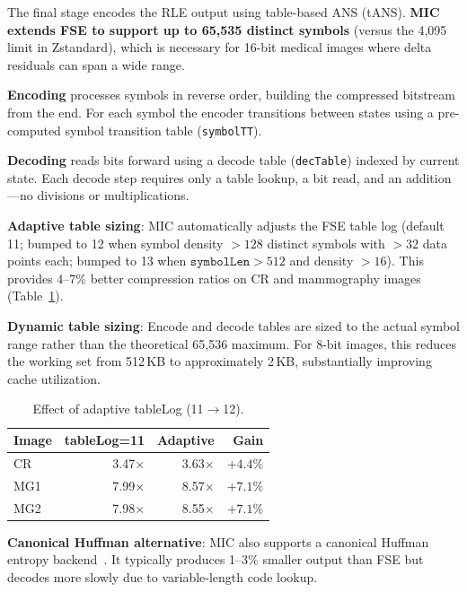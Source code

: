 \documentclass[10pt,twocolumn]{article}
\begin{document}
The final stage encodes the RLE output using table-based ANS (tANS). \textbf{MIC extends FSE to support up to 65,535 distinct symbols} (versus the 4,095 limit in Zstandard), which is necessary for 16-bit medical images where delta residuals can span a wide range.

\textbf{Encoding} processes symbols in reverse order, building the compressed bitstream from the end. For each symbol the encoder transitions between states using a pre-computed symbol transition table (\texttt{symbolTT}).

\textbf{Decoding} reads bits forward using a decode table (\texttt{decTable}) indexed by current state. Each decode step requires only a table lookup, a bit read, and an addition---no divisions or multiplications.

\textbf{Adaptive table sizing}: MIC automatically adjusts the FSE table log (default 11; bumped to 12 when symbol density $>128$ distinct symbols with $>32$ data points each; bumped to 13 when $\mathtt{symbolLen} > 512$ and density $>16$). This provides 4--7\% better compression ratios on CR and mammography images (Table~\ref{tab:tablelog}).

\textbf{Dynamic table sizing}: Encode and decode tables are sized to the actual symbol range rather than the theoretical 65,536 maximum. For 8-bit images, this reduces the working set from 512\,KB to approximately 2\,KB, substantially improving cache utilization.

\begin{table}[h]
  \centering
  \caption{Effect of adaptive tableLog (11$\to$12).}
  \label{tab:tablelog}
  \small
  \begin{tabular}{lrrr}
    \toprule
    Image & tableLog=11 & Adaptive & Gain \\
    \midrule
    CR  & 3.47$\times$ & 3.63$\times$ & $+4.4\%$ \\
    MG1 & 7.99$\times$ & 8.57$\times$ & $+7.1\%$ \\
    MG2 & 7.98$\times$ & 8.55$\times$ & $+7.1\%$ \\
    \bottomrule
  \end{tabular}
\end{table}

\textbf{Canonical Huffman alternative}: MIC also supports a canonical Huffman entropy backend~\cite{schwartz1964}. It typically produces 1--3\% smaller output than FSE but decodes more slowly due to variable-length code lookup.

\end{document}
